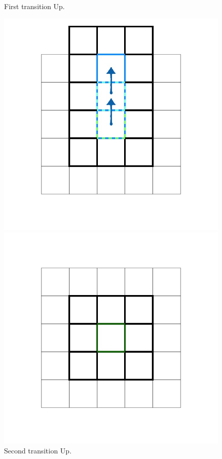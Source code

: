 \documentclass[class=article, crop=false]{standalone}
\begin{document}
\begin{figure}[ht]
\begin{minipage}[c]{0.33\linewidth}
\captionsetup{width=.8\linewidth}
\caption{First transition Up.}
\label{fig:Thesis_D2Q9andQ9.010}
\end{minipage}
\begin{minipage}[c]{0.33\linewidth}
\centering

\includegraphics[scale=0.17]{draw/Thesis_plots/Thesis_D2Q9andQ9_crop/Thesis_D2Q9andQ9.011}

\captionsetup{width=.8\linewidth}
\caption{Second transition Up.}
\label{fig:Thesis_D2Q9andQ9.011}
\end{minipage}


\begin{minipage}[c]{0.33\linewidth}
\centering

\includegraphics[scale=0.17]{draw/Thesis_plots/Thesis_D2Q9andQ9_crop/Thesis_D2Q9andQ9.013}


\end{minipage}
\end{figure}
\end{document}
